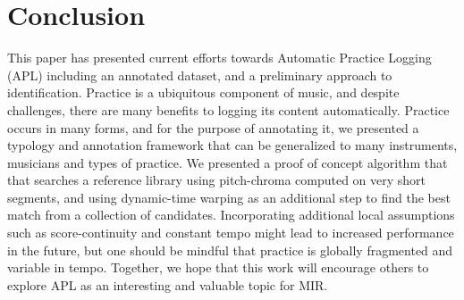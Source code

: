 \documentclass{article}
\begin{document}




\section{Conclusion}
This paper has presented current efforts towards Automatic Practice Logging (APL) including an annotated dataset, and a preliminary approach to identification.  Practice is a ubiquitous component of music, and despite challenges, there are many benefits to logging its content automatically. Practice occurs in many forms, and for the purpose of annotating it, we presented a typology and annotation framework that can be generalized to many instruments, musicians and types of practice.  We presented a proof of concept algorithm that that searches a reference library using pitch-chroma computed on very short segments, and using dynamic-time warping as an additional step to find the best match from a collection of candidates. Incorporating additional local assumptions such as score-continuity and constant tempo might lead to increased performance in the future, but one should be mindful that practice is globally fragmented and variable in tempo. Together, we hope that this work will encourage others to explore APL as an interesting and valuable topic for MIR.     



%
%
%
%
\end{document}
